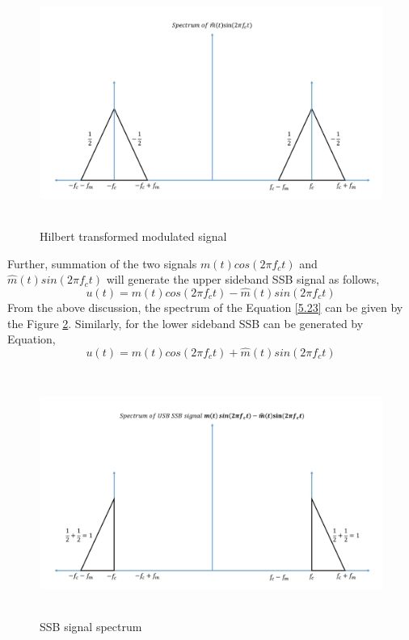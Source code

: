\begin{figure}[h]
	\centering
	\includegraphics[width=1.0\textwidth, height=8cm]{./sdf/simplified_coherent_receiver/figures/SSB5.pdf}
	\caption{Hilbert transformed modulated signal}\label{Hilbert_Final}
\end{figure}

Further, summation of the two signals ${m(t)} cos(2\pi f_c t)$ and ${\hat{m}(t)} sin(2\pi f_c t)$ will generate the upper sideband SSB signal as follows,
\begin{equation}
u(t)={m(t)} cos(2\pi f_c t)-{\hat{m}(t)} sin(2\pi f_c t)
\label{5.23}
\end{equation}
From the above discussion, the spectrum of the Equation \ref{5.23} can be given by the Figure \ref{SSB_signal_spectrum}. Similarly, for the lower sideband SSB can be generated by Equation,
\begin{equation}
u(t)={m(t)} cos(2\pi f_c t)+{\hat{m}(t)} sin(2\pi f_c t)
\label{5.24}
\end{equation}
\begin{figure}[h]
	\centering
	\includegraphics[width=1.0\textwidth, height=8cm]{./sdf/simplified_coherent_receiver/figures/SSB6.pdf}
	\caption{SSB signal spectrum}\label{SSB_signal_spectrum}
\end{figure}


